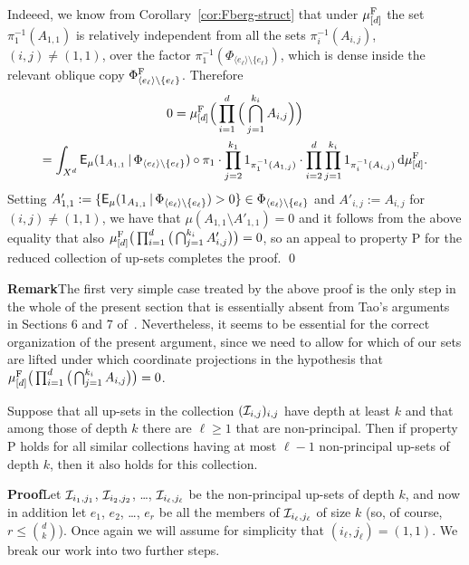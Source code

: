 \documentclass[12pt]{article}
\begin{document}
Indeeed, we know from Corollary~\ref{cor:Fberg-struct} that under
$\mu^{\rm{F}}_{[d]}$ the set $\pi_1^{-1}(A_{1,1})$ is relatively
independent from all the sets $\pi_i^{-1}(A_{i,j})$, $(i,j) \neq
(1,1)$, over the factor $\pi_1^{-1}(\Phi_{\langle
e_\ell\rangle\setminus\{e_\ell\}})$, which is dense inside the
relevant oblique copy $\Phi^{\rm{F}}_{\langle
e_\ell\rangle\setminus\{e_\ell\}}$.  Therefore
\begin{multline*}
0 =
\mu^{\rm{F}}_{[d]}\Big(\prod_{i=1}^d\Big(\bigcap_{j=1}^{k_i}A_{i,j}\Big)\Big)\\
= \int_{X^d}\sfE_\mu(1_{A_{1,1}}\,|\,\Phi_{\langle
e_\ell\rangle\setminus\{e_\ell\}})\circ\pi_1\cdot\prod_{j=2}^{k_1}1_{\pi_1^{-1}(A_{1,j})}\cdot\prod_{i=2}^d\prod_{j=1}^{k_i}1_{\pi_i^{-1}(A_{i,j})}\,\d\mu^{\rm{F}}_{[d]}.
\end{multline*}
Setting $A'_{1,1}:= \{\sfE_\mu(1_{A_{1,1}}\,|\,\Phi_{\langle
e_\ell\rangle\setminus\{e_\ell\}}) > 0\} \in \Phi_{\langle
e_\ell\rangle\setminus\{e_\ell\}}$ and $A'_{i,j} := A_{i,j}$ for
$(i,j) \neq (1,1)$, we have that $\mu(A_{1,1}\setminus A'_{1,1}) =
0$ and it follows from the above equality that also
$\mu^{\rm{F}}_{[d]}\big(\prod_{i=1}^d\big(\bigcap_{j=1}^{k_i}A'_{i,j}\big)\big)
= 0$, so an appeal to property P for the reduced collection of
up-sets completes the proof. \qed

\textbf{Remark}\quad The first very simple case treated by the above
proof is the only step in the whole of the present section that is
essentially absent from Tao's arguments in Sections 6 and 7
of~\cite{Tao07}.  Nevertheless, it seems to be essential for the
correct organization of the present argument, since we need to allow
for which of our sets are lifted under which coordinate projections
in the hypothesis that
$\mu_{[d]}^{\rm{F}}\big(\prod_{i=1}^d\big(\bigcap_{j=1}^{k_i}A_{i,j}\big)\big)
= 0$. \fin

\begin{lem}\label{lem:lift-gen}
Suppose that all up-sets in the collection $(\I_{i,j})_{i,j}$ have
depth at least $k$ and that among those of depth $k$ there are $\ell
\geq 1$ that are non-principal.  Then if property P holds for all
similar collections having at most $\ell - 1$ non-principal up-sets
of depth $k$, then it also holds for this collection.
\end{lem}

\textbf{Proof}\quad Let $\I_{i_1,j_1}$, $\I_{i_2,j_2}$, \ldots,
$\I_{i_\ell,j_\ell}$ be the non-principal up-sets of depth $k$, and
now in addition let $e_1$, $e_2$, \ldots, $e_r$ be all the members
of $\I_{i_\ell,j_\ell}$ of size $k$ (so, of course, $r \leq
\binom{d}{k}$). Once again we will assume for simplicity that
$(i_\ell,j_\ell) = (1,1)$.  We break our work into two further
steps.
\end{document}
